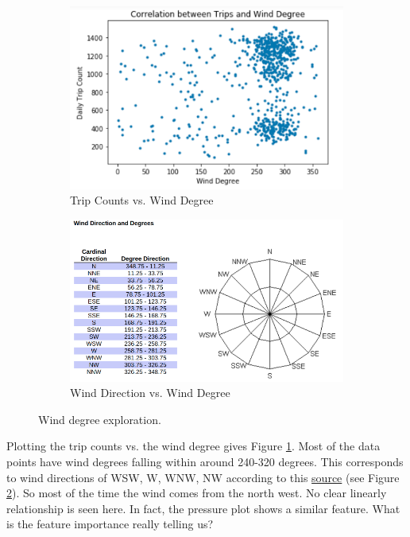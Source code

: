 \documentclass[a4paper]{article}
\begin{document}
			\begin{figure}
				\begin{subfigure}[b]{0.4\textwidth}
					\includegraphics[width=\textwidth]{WindDegree.png}
					\caption{Trip Counts vs. Wind Degree}
					\label{fig:wind_degree}
				\end{subfigure}
				\begin{subfigure}[b]{0.6\textwidth}
					\includegraphics[width=\textwidth]{WindDirection.png}
					\caption{Wind Direction vs. Wind Degree}
					\label{fig:wind_direction}
				\end{subfigure}
				\caption{Wind degree exploration.}
				\label{fig:wind}
			\end{figure}
			
			Plotting the trip counts vs. the wind degree gives Figure \ref{fig:wind_degree}. Most of the data points have wind degrees falling within around 240-320 degrees. This corresponds to wind directions of WSW, W, WNW, NW according to this \href{http://snowfence.umn.edu/Components/winddirectionanddegreeswithouttable3.htm}{source} (see Figure \ref{fig:wind_direction}). So most of the time the wind comes from the north west. No clear linearly relationship is seen here. In fact, the pressure plot shows a similar feature. What is the feature importance really telling us?
\end{document}
